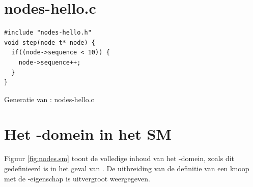 \section{nodes-hello.c}
\vspace{-5mm}
\begin{listing}[H]
  \begin{verbatim}
#include "nodes-hello.h"
void step(node_t* node) {
  if((node->sequence < 10)) {
    node->sequence++;
  }
}
  \end{verbatim}
  \vspace{-5mm}
  \caption{Generatie van : nodes-hello.c}
\end{listing}

\section{Het -domein in het SM}
\label{section:nodes.sm}

Figuur \ref{fig:nodes.sm} toont de volledige inhoud van het -domein,
zoals dit gedefinieerd is in het geval van . De uitbreiding van
de definitie van een knoop met de -eigenschap is uitvergroot
weergegeven.

